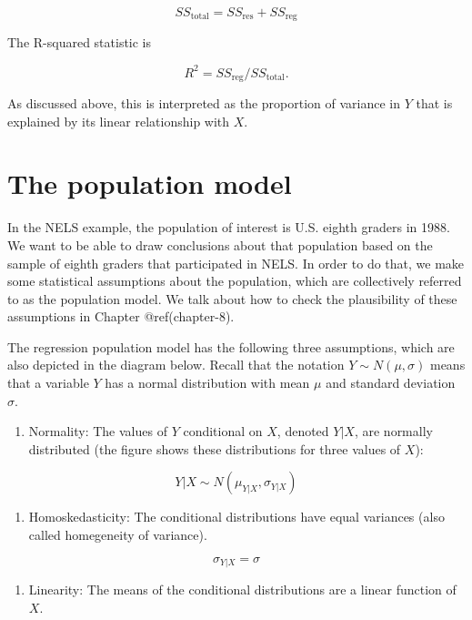 \documentclass[
  letterpaper,
  DIV=11,
  numbers=noendperiod]{scrreprt}
\providecommand{\tightlist}{%
  \setlength{\itemsep}{0pt}\setlength{\parskip}{0pt}}\usepackage{longtable,booktabs,array}
\begin{document}
\[ SS_{\text{total}} = SS_\text{res} + SS_\text{reg} \]

The R-squared statistic is

\[R^2 = SS_{\text{reg}} / SS_{\text{total}}. \]

As discussed above, this is interpreted as the proportion of variance in
\(Y\) that is explained by its linear relationship with \(X\).

\hypertarget{population-model-2}{%
\section{The population model}\label{population-model-2}}

In the NELS example, the population of interest is U.S. eighth graders
in 1988. We want to be able to draw conclusions about that population
based on the sample of eighth graders that participated in NELS. In
order to do that, we make some statistical assumptions about the
population, which are collectively referred to as the population model.
We talk about how to check the plausibility of these assumptions in
Chapter @ref(chapter-8).

The regression population model has the following three assumptions,
which are also depicted in the diagram below. Recall that the notation
\(Y \sim N(\mu, \sigma)\) means that a variable \(Y\) has a normal
distribution with mean \(\mu\) and standard deviation \(\sigma\).

\begin{enumerate}
\def\labelenumi{\arabic{enumi}.}
\tightlist
\item
  Normality: The values of \(Y\) conditional on \(X\), denoted \(Y|X\),
  are normally distributed (the figure shows these distributions for
  three values of \(X\)):
\end{enumerate}

\[Y | X \sim  N(\mu_{Y | X} , \sigma_{Y | X}) \]

\begin{enumerate}
\def\labelenumi{\arabic{enumi}.}
\setcounter{enumi}{1}
\tightlist
\item
  Homoskedasticity: The conditional distributions have equal variances
  (also called homegeneity of variance).
\end{enumerate}

\[ \sigma_{Y| X} = \sigma \]

\begin{enumerate}
\def\labelenumi{\arabic{enumi}.}
\setcounter{enumi}{2}
\tightlist
\item
  Linearity: The means of the conditional distributions are a linear
  function of \(X\).
\end{enumerate}
\end{document}
